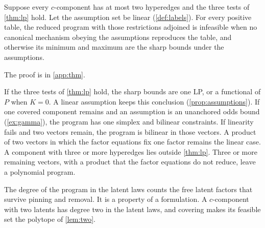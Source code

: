 \begin{proposition}
\label{prop:assumptions}
Suppose every $c$-component has at most two hyperedges and the three tests of \cref{thm:lp} hold. Let the assumption set be linear (\cref{def:labels}). For every positive table, the reduced program with those restrictions adjoined is infeasible when no canonical mechanism obeying the assumptions reproduces the table, and otherwise its minimum and maximum are the sharp bounds under the assumptions.
\end{proposition}

The proof is in \cref{app:thm}.


\begin{corollary}[Solver]
\label{cor:solver}
If the three tests of \cref{thm:lp} hold, the sharp bounds are one LP, or a functional of $P$ when $K=0$. A linear assumption keeps this conclusion (\cref{prop:assumptions}). If one covered component remains and an assumption is an unanchored odds bound (\cref{ex:gamma}), the program has one simplex and bilinear constraints. If linearity fails and two vectors remain, the program is bilinear in those vectors. A product of two vectors in which the factor equations fix one factor remains the linear case. A component with three or more hyperedges lies outside \cref{thm:lp}. Three or more remaining vectors, with a product that the factor equations do not reduce, leave a polynomial program.
\end{corollary}

The degree of the program in the latent laws counts the free latent factors that survive pinning and removal. It is a property of a formulation. A $c$-component with two latents has degree two in the latent laws, and covering makes its feasible set the polytope of \cref{lem:two}.
